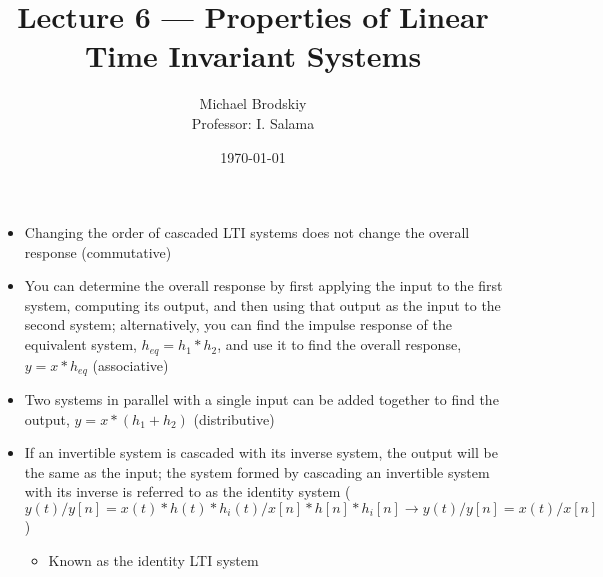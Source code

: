 


\title{Lecture 6 — Properties of Linear Time Invariant Systems}
\date{\today}
\author{Michael Brodskiy\\ \small Professor: I. Salama}



\maketitle

\begin{itemize}

  \item Changing the order of cascaded LTI systems does not change the overall response (commutative)

  \item You can determine the overall response by first applying the input to the first system, computing its output, and then using that output as the input to the second system; alternatively, you can find the impulse response of the equivalent system, $h_{eq}=h_1*h_2$, and use it to find the overall response, $y=x*h_{eq}$ (associative)

  \item Two systems in parallel with a single input can be added together to find the output, $y=x*(h_1+h_2)$ (distributive)

  \item If an invertible system is cascaded with its inverse system, the output will be the same as the input; the system formed by cascading an invertible system with its inverse is referred to as the identity system ($y(t)/y[n]=x(t)*h(t)*h_i(t)/x[n]*h[n]*h_i[n]\to y(t)/y[n]=x(t)/x[n]$)

    \begin{itemize}

      \item Known as the identity LTI system

    \end{itemize}

\end{itemize}



